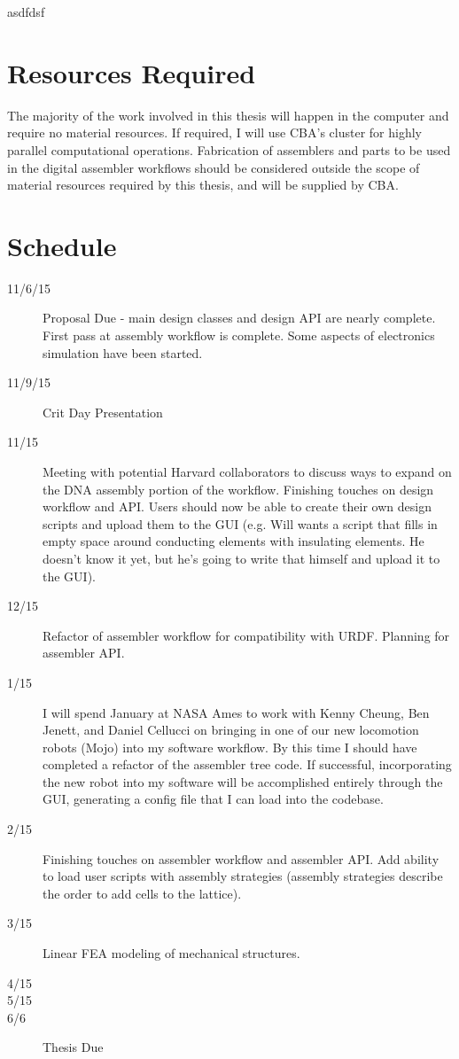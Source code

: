 asdfdsf

\section{Resources Required}

The majority of the work involved in this thesis will happen in the computer and require no material resources.  If required, I will use CBA's cluster for highly parallel computational operations.  Fabrication of assemblers and parts to be used in the digital assembler workflows should be considered outside the scope of material resources required by this thesis, and will be supplied by CBA.

\section{Schedule}

\begin{description}
  \item[11/6/15]\tabto{1.5cm}Proposal Due - main design classes and design API are nearly complete.  First pass at assembly workflow is complete.  Some aspects of electronics simulation have been started.
  \item[11/9/15]\tabto{1.5cm}Crit Day Presentation
  \item[11/15]\tabto{1.5cm}Meeting with potential Harvard collaborators to discuss ways to expand on the DNA assembly portion of the workflow.  Finishing touches on design workflow and API.  Users should now be able to create their own design scripts and upload them to the GUI (e.g. Will wants a script that fills in empty space around conducting elements with insulating elements.  He doesn't know it yet, but he's going to write that himself and upload it to the GUI).
  \item[12/15]\tabto{1.5cm}Refactor of assembler workflow for compatibility with URDF.  Planning for assembler API.
  \item[1/15]\tabto{1.5cm}I will spend January at NASA Ames to work with Kenny Cheung, Ben Jenett, and Daniel Cellucci on bringing in one of our new locomotion robots (Mojo) into my software workflow.  By this time I should have completed a refactor of the assembler tree code.  If successful, incorporating the new robot into my software will be accomplished entirely through the GUI, generating a config file that I can load into the codebase. 
  \item[2/15]\tabto{1.5cm}Finishing touches on assembler workflow and assembler API.  Add ability to load user scripts with assembly strategies (assembly strategies describe the order to add cells to the lattice).
  \item[3/15]\tabto{1.5cm}Linear FEA modeling of mechanical structures.
  \item[4/15]\tabto{1.5cm}
  \item[5/15]\tabto{1.5cm}
  \item[6/6]\tabto{1.5cm}Thesis Due
\end{description}
